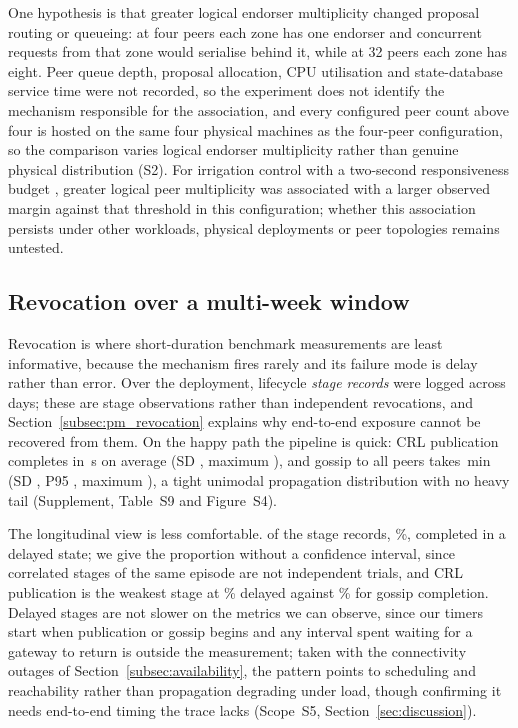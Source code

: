 \documentclass[a4paper,fleqn]{cas-dc}
\begin{document}
One hypothesis is that greater logical endorser multiplicity changed
proposal routing or queueing: at four peers each zone has one endorser and
concurrent requests from that zone would serialise behind it, while at 32
peers each zone has eight. Peer queue depth, proposal allocation, CPU
utilisation and state-database service time were not recorded, so the
experiment does not identify the mechanism responsible for the
association, and every configured peer count above four is hosted on the
same four physical machines as the four-peer configuration, so the
comparison varies logical endorser multiplicity rather than genuine
physical distribution (S2). For irrigation control with a two-second
responsiveness budget \cite{leacox2013wireless}, greater logical peer
multiplicity was associated with a larger observed margin against that
threshold in this configuration; whether this association persists under
other workloads, physical deployments or peer topologies remains
untested.

\subsection{Revocation over a multi-week window}
\label{subsec:revocation}

Revocation is where short-duration benchmark measurements are least
informative, because the mechanism fires rarely and its failure mode is
delay rather than error.
Over the deployment, \RevEvents{} lifecycle \emph{stage records} were
logged across \RevDays{} days; these are stage observations rather than
independent revocations, and Section~\ref{subsec:pm_revocation} explains
why end-to-end exposure cannot be recovered from them. On the happy path
the pipeline is quick: CRL publication completes in \RevPubMean\,s on
average (SD \RevPubSD, maximum \RevPubMax), and gossip to all peers takes
\RevGossipMean\,min (SD \RevGossipSD, P95 \RevGossipPNinetyFive, maximum
\RevGossipMax), a tight unimodal propagation distribution with no heavy
tail (Supplement, Table~S9 and Figure~S4).

The longitudinal view is less comfortable. \RevDelayed{} of the
\RevEvents{} stage records, \RevDelayedPct\%, completed in a delayed
state; we give the proportion without a confidence interval, since
correlated stages of the same episode are not independent trials, and CRL
publication is the weakest stage at \RevWorstTypePct\% delayed against
\RevBestTypePct\% for gossip completion. Delayed stages are not slower on
the metrics we can observe, since our timers start when publication or
gossip begins and any interval spent waiting for a gateway to return is
outside the measurement; taken with the connectivity outages of
Section~\ref{subsec:availability}, the pattern points to scheduling and
reachability rather than propagation degrading under load, though
confirming it needs end-to-end timing the trace lacks (Scope~S5,
Section~\ref{sec:discussion}).
\end{document}
